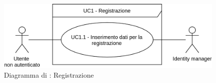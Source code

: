  \label{AccessoPiattaforma}
\label{registrazione}

\begin{figure}[H]
	\centering
	\includegraphics[scale=1]{Immagini/DiagrammiUC/AccessoAllaPiattaforma/Registrazione.png}
	\caption{Diagramma di \actualUC: Registrazione}
	\label{fig:registrazione}
\end{figure}


